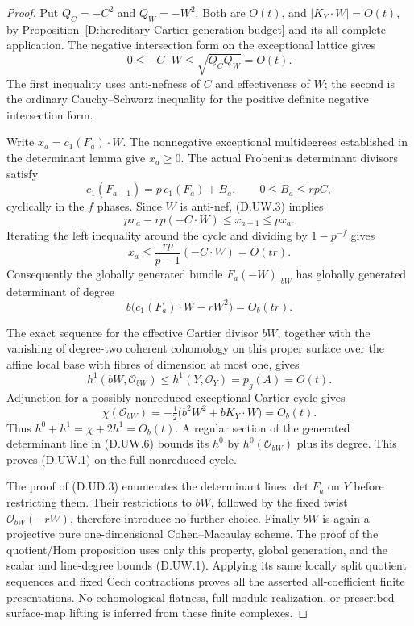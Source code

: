 \begin{proof}
Put $Q_C=-C^2$ and $Q_W=-W^2$. Both are $O(t)$, and
$|K_Y\cdot W|=O(t)$, by
Proposition~\ref{D:hereditary-Cartier-generation-budget}
and its all-complete application. The negative intersection
form on the exceptional lattice gives
\[
 0\le -C\cdot W\le\sqrt{Q_CQ_W}=O(t).                   \tag{D.UW.2}
\]
The first inequality uses anti-nefness of $C$ and effectiveness
of $W$; the second is the ordinary Cauchy--Schwarz inequality
for the positive definite negative intersection form.

Write $x_a=c_1(F_a)\cdot W$. The nonnegative exceptional
multidegrees established in the determinant lemma give
$x_a\ge0$. The actual Frobenius determinant divisors satisfy
\[
 c_1(F_{a+1})=p\,c_1(F_a)+B_a,\qquad 0\le B_a\le rpC,
                                                        \tag{D.UW.3}
\]
cyclically in the $f$ phases. Since $W$ is anti-nef, (D.UW.3)
implies
\[
 p x_a-rp(-C\cdot W)\le x_{a+1}\le p x_a.
                                                        \tag{D.UW.4}
\]
Iterating the left inequality around the cycle and dividing
by $1-p^{-f}$ gives
\[
 x_a\le \frac{rp}{p-1}(-C\cdot W)=O(tr).                 \tag{D.UW.5}
\]
Consequently the globally generated bundle
$F_a(-W)|_{bW}$ has globally generated determinant of degree
\[
 b\bigl(c_1(F_a)\cdot W-rW^2\bigr)=O_b(tr).              \tag{D.UW.6}
\]

The exact sequence for the effective Cartier divisor $bW$,
together with the vanishing of degree-two coherent cohomology
on this proper surface over the affine local base with fibres
of dimension at most one, gives
\[
 h^1(bW,\mathcal O_{bW})\le
 h^1(Y,\mathcal O_Y)=p_g(A)=O(t).
                                                        \tag{D.UW.7}
\]
Adjunction for a possibly nonreduced exceptional Cartier cycle
gives
\[
 \chi(\mathcal O_{bW})
           =-\tfrac12\bigl(b^2W^2+bK_Y\cdot W\bigr)=O_b(t).
                                                        \tag{D.UW.8}
\]
Thus $h^0+h^1=\chi+2h^1=O_b(t)$. A regular section of
the generated determinant line in (D.UW.6) bounds its $h^0$
by $h^0(\mathcal O_{bW})$ plus its degree. This proves
(D.UW.1) on the full nonreduced cycle.

The proof of (D.UD.3) enumerates the determinant lines
$\det F_a$ on $Y$ before restricting them. Their restrictions
to $bW$, followed by the fixed twist $\mathcal O_{bW}(-rW)$,
therefore introduce no further choice. Finally $bW$ is again
a projective pure one-dimensional Cohen--Macaulay scheme.
The proof of the quotient/Hom proposition uses only this
property, global generation, and the scalar and line-degree
bounds (D.UW.1). Applying its same locally split quotient
sequences and fixed Cech contractions proves all the asserted
all-coefficient finite presentations. No cohomological
flatness, full-module realization, or prescribed surface-map
lifting is inferred from these finite complexes.
\end{proof}
